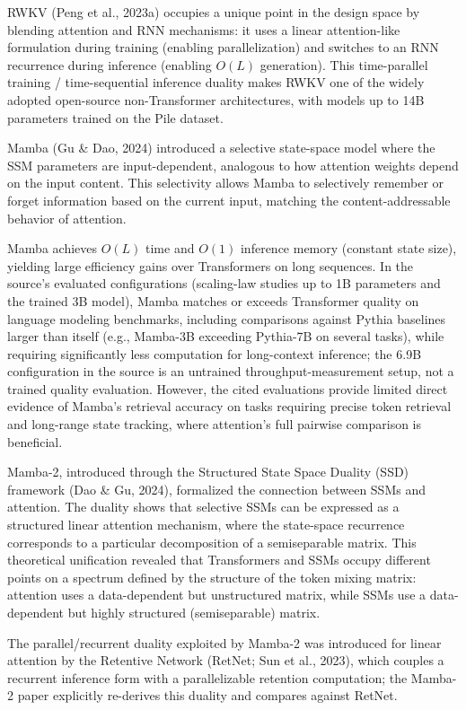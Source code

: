 \documentclass[10pt,twocolumn]{article}
\begin{document}
RWKV (Peng et al., 2023a) occupies a unique point in the design space by blending attention and RNN mechanisms: it uses a linear attention-like formulation during training (enabling parallelization) and switches to an RNN recurrence during inference (enabling $O(L)$ generation). This time-parallel training / time-sequential inference duality makes RWKV one of the widely adopted open-source non-Transformer architectures, with models up to 14B parameters trained on the Pile dataset.

Mamba (Gu \& Dao, 2024) introduced a selective state-space model where the SSM parameters are input-dependent, analogous to how attention weights depend on the input content. This selectivity allows Mamba to selectively remember or forget information based on the current input, matching the content-addressable behavior of attention.

Mamba achieves $O(L)$ time and $O(1)$ inference memory (constant state size), yielding large efficiency gains over Transformers on long sequences. In the source's evaluated configurations (scaling-law studies up to 1B parameters and the trained 3B model), Mamba matches or exceeds Transformer quality on language modeling benchmarks, including comparisons against Pythia baselines larger than itself (e.g., Mamba-3B exceeding Pythia-7B on several tasks), while requiring significantly less computation for long-context inference; the 6.9B configuration in the source is an untrained throughput-measurement setup, not a trained quality evaluation. However, the cited evaluations provide limited direct evidence of Mamba's retrieval accuracy on tasks requiring precise token retrieval and long-range state tracking, where attention's full pairwise comparison is beneficial.

Mamba-2, introduced through the Structured State Space Duality (SSD) framework (Dao \& Gu, 2024), formalized the connection between SSMs and attention. The duality shows that selective SSMs can be expressed as a structured linear attention mechanism, where the state-space recurrence corresponds to a particular decomposition of a semiseparable matrix. This theoretical unification revealed that Transformers and SSMs occupy different points on a spectrum defined by the structure of the token mixing matrix: attention uses a data-dependent but unstructured matrix, while SSMs use a data-dependent but highly structured (semiseparable) matrix.

The parallel/recurrent duality exploited by Mamba-2 was introduced for linear attention by the Retentive Network (RetNet; Sun et al., 2023), which couples a recurrent inference form with a parallelizable retention computation; the Mamba-2 paper explicitly re-derives this duality and compares against RetNet.
\end{document}
